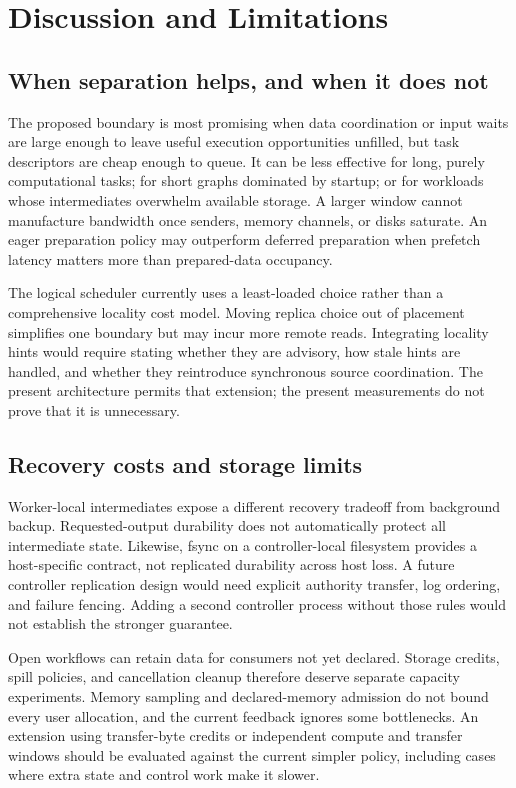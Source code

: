 \section{Discussion and Limitations}
\subsection{When separation helps, and when it does not}
The proposed boundary is most promising when data coordination or input waits
are large enough to leave useful execution opportunities unfilled, but task
descriptors are cheap enough to queue. It can be less effective for long,
purely computational tasks; for short graphs dominated by startup; or for
workloads whose intermediates overwhelm available storage. A larger window
cannot manufacture bandwidth once senders, memory channels, or disks saturate.
An eager preparation policy may outperform deferred preparation when prefetch
latency matters more than prepared-data occupancy.

The logical scheduler currently uses a least-loaded choice rather than a
comprehensive locality cost model. Moving replica choice out of placement
simplifies one boundary but may incur more remote reads. Integrating locality
hints would require stating whether they are advisory, how stale hints are
handled, and whether they reintroduce synchronous source coordination. The
present architecture permits that extension; the present measurements do not
prove that it is unnecessary.

\subsection{Recovery costs and storage limits}
Worker-local intermediates expose a different recovery tradeoff from
background backup. Requested-output durability does not automatically protect
all intermediate state. Likewise, fsync on a controller-local filesystem
provides a host-specific contract, not replicated durability across host loss.
A future controller replication design would need explicit authority transfer,
log ordering, and failure fencing. Adding a second controller process without
those rules would not establish the stronger guarantee.

Open workflows can retain data for consumers not yet declared. Storage
credits, spill policies, and cancellation cleanup therefore deserve separate
capacity experiments. Memory sampling and declared-memory admission do not
bound every user allocation, and the current feedback ignores some bottlenecks.
An extension using transfer-byte credits or independent compute and transfer
windows should be evaluated against the current simpler policy, including
cases where extra state and control work make it slower.


